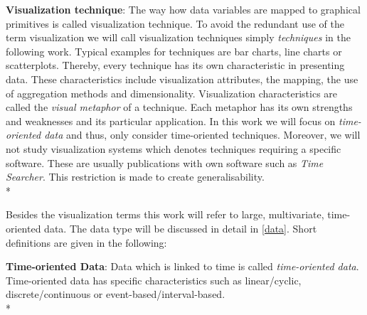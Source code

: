 \iffalse
Data Mining tools allow automatic decision-making by algorithms which are applied to the data and extract patterns in an automatic way\cite{Goebel1999}. Exploratory data analysis (EDA) tools are used to mine data with support of human input. We will use the definition of EDA tools for  visualization tools in this work. As a pwc-survey showed eventhough automatic ways for decision support exist data analysis still relies on human judgement and thus\cite{PwC2016}, visualization tools are used to support the business user in the data discovery process. The main goal of visualization tools is the user support in gaining insights into the data. 
Visualization tools display hundreds of items on the screen and offer interaction techniques such as zooming and filtering\cite{Shneiderman2008}.
\fi

\textbf{Visualization technique}: The way how data variables are mapped to graphical primitives is called visualization technique. To avoid the redundant use of the term visualization we will call visualization techniques simply \textit{techniques} in the following work. Typical examples for techniques are bar charts, line charts or scatterplots. Thereby, every technique has its own characteristic in presenting data. These characteristics include visualization attributes, the mapping, the use of aggregation methods and dimensionality. Visualization characteristics are called the \textit{visual metaphor} of a technique\cite{Tegarden1999}. Each metaphor has its own strengths and weaknesses and its particular application. In this work we will focus on \textit{time-oriented data} and thus, only consider time-oriented techniques. Moreover, we will not study visualization systems which denotes techniques requiring a specific software. These are usually publications with own software such as \textit{Time Searcher}\cite{Hochheiser2004,Buono}. This restriction is made to create generalisability.\\*

Besides the visualization terms this work will refer to large, multivariate, time-oriented data. The data type will be discussed in detail in \ref{data}. Short definitions are given in the following: 

\textbf{Time-oriented Data}: Data which is linked to time\cite{Aigner2011} is called \textit{time-oriented data}. Time-oriented data has specific characteristics such as linear/cyclic, discrete/continuous or event-based/interval-based. \\*

